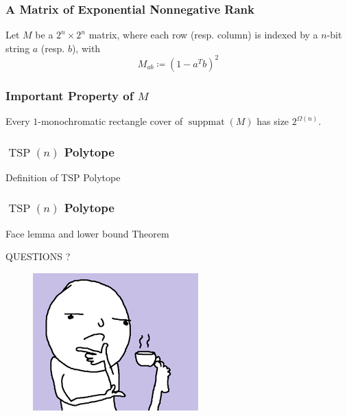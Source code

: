 \documentclass{beamer}
\newcommand{\suppmat}{\operatorname{suppmat}}
\newcommand{\TSP}{\operatorname{TSP}}
\begin{document}
\begin{frame}
\frametitle{A Matrix of Exponential Nonnegative Rank}

\pause
\begin{definition}
Let $M$ be a $2^n \times 2^n$ matrix, where each row (resp. column) is indexed by a $n$-bit string $a$ (resp. $b$), with
\[
M_{ab} \coloneqq {\left(1 - a^Tb\right)}^2
\]
\end{definition}
\end{frame}


\begin{frame}
\frametitle{Important Property of $M$}


\pause
\begin{theorem}[De Wolf, '03]
Every $1$-monochromatic rectangle cover of $\suppmat(M)$ has size $2^{\Omega(n)}$.
\end{theorem}

\end{frame}

\begin{frame}
\frametitle{$\TSP(n)$ Polytope}
Definition of TSP Polytope
\end{frame}

\begin{frame}
\frametitle{$\TSP(n)$ Polytope}
Face lemma and lower bound Theorem
\end{frame}

\begin{frame}
\begin{center}
\LARGE{QUESTIONS ?}
\end{center}
\begin{figure}
        \centering
        \begin{minipage}{.5\textwidth}
            \centering
            \includegraphics[width=.8\linewidth]{questions.png}
        \end{minipage}%
        
\end{figure}
\end{frame}
\end{document}
